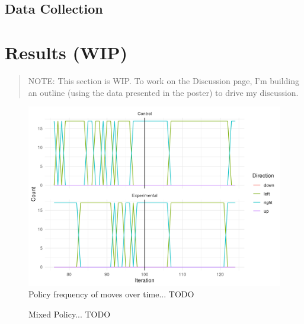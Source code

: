 \documentclass[12pt]{article}
\begin{document}
\subsection{Data Collection}


\section{Results (WIP)}

\begin{quote}
	NOTE: This section is WIP. To work on the Discussion page, I'm building an outline (using the data presented in the poster) to drive my discussion.
\end{quote}

\begin{figure}[h]
	\includegraphics[width=\linewidth]{graph_directional.png}
	\caption{Policy frequency of moves over time... TODO}
	\label{fig:directional}
\end{figure}


\begin{figure}[h]
	\begin{center}
		\begin{subfigure}{0.4\linewidth}
			
		\end{subfigure}
		\hspace{0.1in}
		\begin{subfigure}{0.4\linewidth}
			
		\end{subfigure}
	\end{center}
	\begin{center}
		\begin{subfigure}{0.4\linewidth}
			
		\end{subfigure}
		\hspace{0.1in}
		\begin{subfigure}{0.4\linewidth}
			
		\end{subfigure}
	\end{center}
	\caption{Mixed Policy... TODO}
	\label{fig:policy_mixed}
\end{figure}
\end{document}
